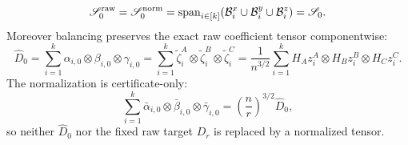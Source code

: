 \begin{proposition}
\begin{equation}
  \mathscr S_0^{\rm raw}=\mathscr S_0^{\rm norm}
  =\operatorname{span}_{i\in[k]}
    (\mathcal B_i^x\cup\mathcal B_i^y\cup\mathcal B_i^z)
  =\mathscr S_0.                                            \label{eq:step-002-5}
\end{equation}
Moreover balancing preserves the exact raw coefficient tensor componentwise:
\begin{equation}
  \widehat D_0
  =\sum_{i=1}^k\alpha_{i,0}\otimes\beta_{i,0}\otimes\gamma_{i,0}
  =\sum_{i=1}^k\widetilde\zeta_i^A\otimes
                    \widetilde\zeta_i^B\otimes
                    \widetilde\zeta_i^C
  =\frac1{n^{3/2}}\sum_{i=1}^k
       H_Az_i^A\otimes H_Bz_i^B\otimes H_Cz_i^C.           \label{eq:step-002-6}
\end{equation}
The normalization is certificate-only:
\begin{equation}
  \sum_{i=1}^k\bar\alpha_{i,0}\otimes\bar\beta_{i,0}
                    \otimes\bar\gamma_{i,0}
  =\left(\frac nr\right)^{3/2}\widehat D_0,                \label{eq:step-002-7}
\end{equation}
so neither \(\widehat D_0\) nor the fixed raw target \(D_r\) is replaced by a
normalized tensor.

\end{proposition}


